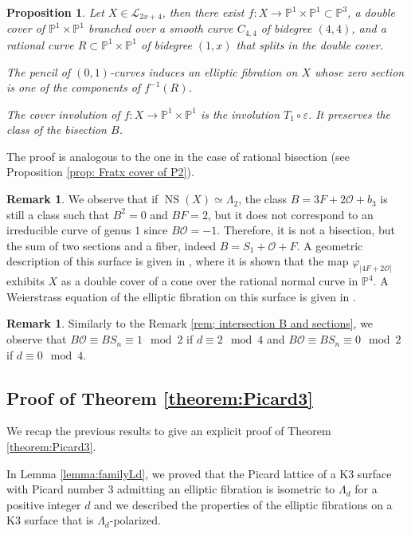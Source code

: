 \documentclass{amsart}
\newtheorem{proposition}[theorem]{Proposition}
\theoremstyle{definition}
\newtheorem{remark}[theorem]{Remark}
\numberwithin{equation}{section}
\newcommand{\ra}{\rightarrow}
\DeclareMathOperator{\NS}{NS}
\begin{document}
\begin{proposition}\label{prop: Fratx cover of P1xP1}
Let $X\in\mathcal{L}_{2x+4}$, then there exist $f:X\ra \mathbb{P}^1\times\mathbb{P}^1\subset \mathbb{P}^3$, a double cover of $\mathbb{P}^1 \times \mathbb{P}^1$ branched over a smooth curve $C_{4,4}$ of bidegree $(4,4)$, and a rational curve $R\subset\mathbb{P}^1 \times \mathbb{P}^1$ of bidegree $(1,x)$ that splits in the double cover.

The pencil of $(0,1)$-curves induces an elliptic fibration on $X$ whose zero section is one of the components of $f^{-1}(R)$.

The cover involution of $f:X\ra\mathbb{P}^1 \times \mathbb{P}^1$ is the involution $ T_1 \circ\varepsilon$. It preserves the class of the bisection $B$.
\end{proposition}
\proof  The proof is analogous to the one in the case of rational bisection (see Proposition \ref{prop: Fratx cover of P2}).
\begin{remark} We observe that if $\NS(X)\simeq \Lambda_2$, the class $B=3F+2\mathcal{O}+b_3$ is still a class such that $B^2=0$ and $BF=2$, but it does not correspond to an irreducible curve of genus $1$ since $B\mathcal{O}=-1$. Therefore, it is not a bisection, but the sum of two sections and a fiber, indeed $B=S_1+\mathcal{O}+F$. A geometric description of this surface is given in \cite{G}, where it is shown that the map $\varphi_{|4F+2\mathcal{O}|}$ exhibits $X$ as a double cover of a cone over the rational normal curve in $\mathbb{P}^4$. A Weierstrass equation of the elliptic fibration on this surface is given in \cite[Section 6.2]{FM}.\end{remark}
\begin{remark}
Similarly to the Remark \ref{rem; intersection B and sections}, we observe that $B\mathcal{O}\equiv BS_n\equiv 1\mod 2$ if $d\equiv 2\mod 4$ and $B\mathcal{O}\equiv BS_n\equiv 0\mod 2$ if $d\equiv 0\mod 4$.\end{remark}
\subsection{Proof of Theorem \ref{theorem:Picard3}}

We recap the previous results to give an explicit proof of Theorem \ref{theorem:Picard3}.

In Lemma \ref{lemma:familyLd}, we proved that the Picard lattice of a K3 surface with Picard number 3 admitting an elliptic fibration is isometric to $\Lambda_d$ for a positive integer $d$ and we described the properties of the elliptic fibrations on a K3 surface that is $\Lambda_d$-polarized.
\end{document}
